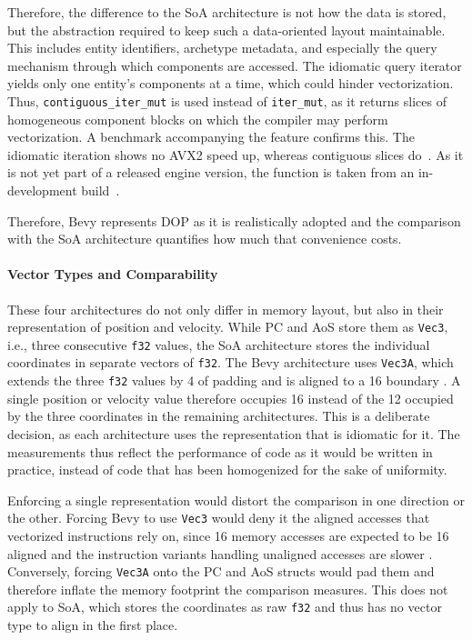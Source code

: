 Therefore, the difference to the \ac{SoA} architecture is not how the data is stored, but the abstraction required to keep such a data-oriented layout maintainable. This includes entity identifiers, archetype metadata, and especially the query mechanism through which components are accessed. The idiomatic query iterator yields only one entity's components at a time, which could hinder vectorization. Thus, \texttt{contiguous\_iter\_mut} is used instead of \texttt{iter\_mut}, as it returns slices of homogeneous component blocks on which the compiler may perform vectorization. A benchmark accompanying the feature confirms this. The idiomatic iteration shows no AVX2 speed up, whereas contiguous slices do~\cite{bevy_contiguous}. As it is not yet part of a released engine version, the function is taken from an in-development build~\cite{bevy_contiguous}.

Therefore, Bevy represents \ac{DOP} as it is realistically adopted and the comparison with the \ac{SoA} architecture quantifies how much that convenience costs.

\paragraph{Vector Types and Comparability}
These four architectures do not only differ in memory layout, but also in their representation of position and velocity. While \ac{PC} and \ac{AoS} store them as \texttt{Vec3}, i.e., three consecutive \texttt{f32} values, the \ac{SoA} architecture stores the individual coordinates in separate vectors of \texttt{f32}. The Bevy architecture uses \texttt{Vec3A}, which extends the three \texttt{f32} values by \qty{4}{\byte} of padding and is aligned to a \qty{16}{\byte} boundary \cite{glam_vec3a}. A single position or velocity value therefore occupies \qty{16}{\byte} instead of the \qty{12}{\byte} occupied by the three coordinates in the remaining architectures. This is a deliberate decision, as each architecture uses the representation that is idiomatic for it. The measurements thus reflect the performance of code as it would be written in practice, instead of code that has been homogenized for the sake of uniformity.

Enforcing a single representation would distort the comparison in one direction or the other. Forcing Bevy to use \texttt{Vec3} would deny it the aligned accesses that vectorized instructions rely on, since \qty{16}{\byte} memory accesses are expected to be \qty{16}{\byte} aligned and the instruction variants handling unaligned accesses are slower \cite{drepper2007every}. Conversely, forcing \texttt{Vec3A} onto the \ac{PC} and \ac{AoS} structs would pad them and therefore inflate the memory footprint the comparison measures. This does not apply to \ac{SoA}, which stores the coordinates as raw \texttt{f32} and thus has no vector type to align in the first place.

